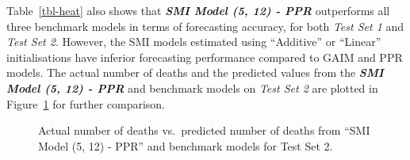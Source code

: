 \documentclass[
  11pt,
  a4paper,
]{article}
\begin{document}
\begin{table}[!hb]

\caption{\label{tbl-heat}Daily mortality forecasting - Out-of-sample
point forecast results.}


\end{table}%

Table~\ref{tbl-heat} also shows that \textbf{\emph{SMI Model (5, 12) -
PPR}} outperforms all three benchmark models in terms of forecasting
accuracy, for both \emph{Test Set 1} and \emph{Test Set 2}. However, the
SMI models estimated using ``Additive'' or ``Linear'' initialisations
have inferior forecasting performance compared to GAIM and PPR models.
The actual number of deaths and the predicted values from the
\textbf{\emph{SMI Model (5, 12) - PPR}} and benchmark models on
\emph{Test Set 2} are plotted in Figure~\ref{fig-heatPred} for further
comparison.

\begin{figure}


\caption{\label{fig-heatPred}Actual number of deaths vs.~predicted
number of deaths from ``SMI Model (5, 12) - PPR'' and benchmark models
for Test Set 2.}

\end{figure}%
\end{document}
